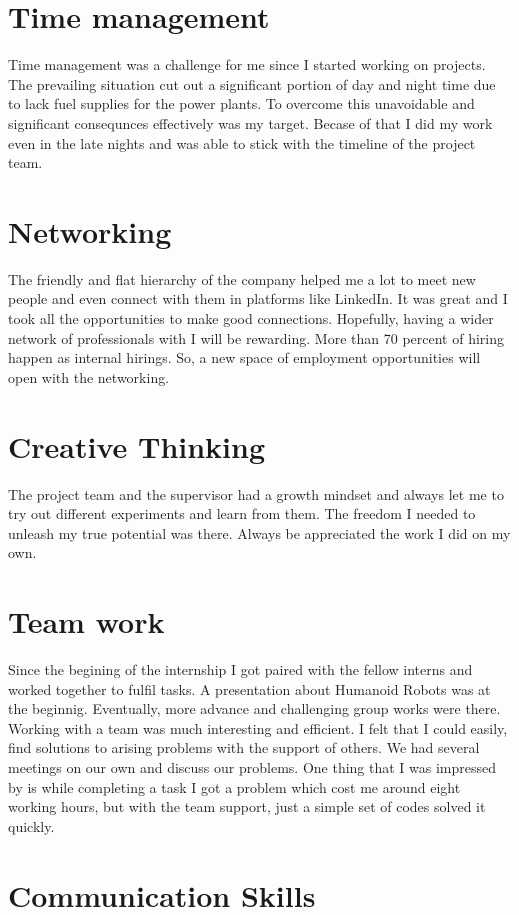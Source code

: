 \documentclass[twoside,12pt,times,onecolumn,a4paper]{report}
\begin{document}
\section{Time management}
Time management was a challenge for me since I started working on projects. The prevailing situation cut out a significant portion of day and night time due to lack fuel supplies for the power plants. To overcome this unavoidable and significant consequnces effectively was my target. Becase of that I did my work even in the late nights and was able to stick with the timeline of the project team. 

\section{Networking}
The friendly and flat hierarchy of the company helped me a lot to meet new people and even connect with them in platforms like LinkedIn. It was great and I took all the opportunities to make good connections. Hopefully, having a wider network of professionals with I will be rewarding. More than 70 percent of hiring happen as internal hirings. So, a new space of employment opportunities will open with the networking. 

\section{Creative Thinking}
The project team and the supervisor had a growth mindset and always let me to try out different experiments and learn from them. The freedom I needed to unleash my true potential was there. Always be appreciated the work I did on my own. 

\section{Team work}
Since the begining of the internship I got paired with the fellow interns and worked together to fulfil tasks. A presentation about Humanoid Robots was at the beginnig. Eventually, more advance and challenging group works were there. Working with a team was much interesting and efficient. I felt that I could easily, find solutions to arising problems with the support of others. We had several meetings on our own and discuss our problems. One thing that I was impressed by is while completing a task I got a problem which cost me around eight working hours, but with the team support, just a simple set of codes solved it quickly. 

\section{Communication Skills}
\end{document}
